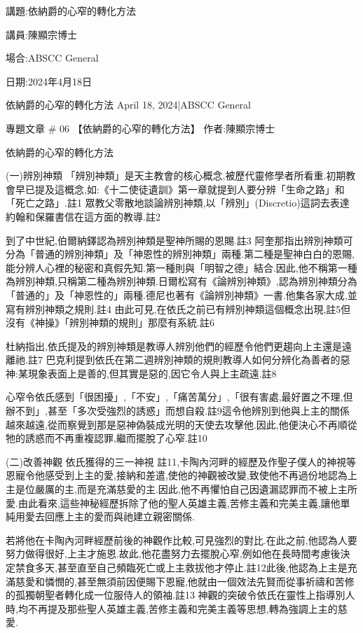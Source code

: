 \documentclass{book}
\begin{document}
講題:依納爵的心窄的轉化方法

講員:陳顯宗博士

場合:ABSCC General

日期:2024年4月18日

依納爵的心窄的轉化方法
April 18, 2024|ABSCC General

專題文章 \# 06
【依納爵的心窄的轉化方法】
作者:陳顯宗博士

依納爵的心窄的轉化方法

(一)辨別神類
「辨別神類」是天主教會的核心概念,被歷代靈修學者所看重.初期教會早已提及這概念,如:《十二使徒遺訓》第一章就提到人要分辨「生命之路」和「死亡之路」.註1 眾教父零散地談論辨別神類,以「辨別」(Discretio)這詞去表達約翰和保羅書信在這方面的教導.註2

到了中世紀,伯爾納鐸認為辨別神類是聖神所賜的恩賜.註3 阿奎那指出辨別神類可分為「普通的辨別神類」及「神恩性的辨別神類」兩種.第二種是聖神白白的恩賜,能分辨人心裡的秘密和真假先知.第一種則與「明智之德」結合.因此,他不稱第一種為辨別神類,只稱第二種為辨別神類.日爾松寫有《論辨別神類》,認為辨別神類分為「普通的」及「神恩性的」兩種.德尼也著有《論辨別神類》一書.他集各家大成,並寫有辨別神類之規則.註4 由此可見,在依氏之前已有辨別神類這個概念出現,註5但沒有《神操》「辨別神類的規則」那麼有系統.註6

杜納指出,依氏提及的辨別神類是教導人辨別他們的經歷令他們更趨向上主還是遠離祂.註7 巴克利提到依氏在第二週辨別神類的規則教導人如何分辨化為善者的惡神:某現象表面上是善的,但其實是惡的,因它令人與上主疏遠.註8

心窄令依氏感到「很困擾」,「不安」,「痛苦萬分」,「很有害處,最好置之不理,但辦不到」,甚至「多次受強烈的誘惑」而想自殺.註9這令他辨別到他與上主的關係越來越遠,從而察覺到那是惡神偽裝成光明的天使去攻擊他.因此,他便決心不再順從牠的誘惑而不再重複認罪,繼而擺脫了心窄.註10

(二)改善神觀
依氏獲得的三一神視 註11,卡陶內河畔的經歷及作聖子僕人的神視等恩寵令他感受到上主的愛,接納和差遣,使他的神觀被改變,致使他不再過份地認為上主是位嚴厲的主,而是充滿慈愛的主.因此,他不再懼怕自己因遺漏認罪而不被上主所愛.由此看來,這些神秘經歷拆除了他的聖人英雄主義,苦修主義和完美主義,讓他單純用愛去回應上主的愛而與祂建立親密關係.

若將他在卡陶內河畔經歷前後的神觀作比較,可見強烈的對比.在此之前,他認為人要努力做得很好,上主才施恩.故此,他花盡努力去擺脫心窄,例如他在長時間考慮後決定禁食多天,甚至直至自己頻臨死亡或上主救拔他才停止.註12此後,他認為上主是充滿慈愛和憐憫的,甚至無須前因便賜下恩寵,他就由一個效法先賢而從事祈禱和苦修的孤獨朝聖者轉化成一位服侍人的領袖.註13 神觀的突破令依氏在靈性上指導別人時,均不再提及那些聖人英雄主義,苦修主義和完美主義等思想,轉為強調上主的慈愛.
\end{document}
